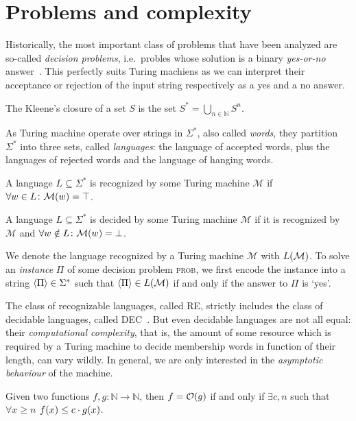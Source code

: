 \section{Problems and complexity}
Historically, the most important class of problems that have been analyzed are so-called
\emph{decision problems}, i.e.\ probles whose solution is a binary \emph{yes-or-no} 
answer~\cite{Sipser2013}.
This perfectly suits Turing machiens as we can interpret their acceptance or rejection of the input 
string respectively as a yes and a no answer.

\begin{definition}
  The Kleene's closure of a set \(S\) is the set \(S^* = \bigcup_{n \in \mathbb{N}}{S^n}\).
\end{definition}

As Turing machine operate over strings in \(\Sigma^*\), also called \emph{words}, they partition 
\(\Sigma^* \) into three sets, called \emph{languages}: the language of accepted words, 
plus the languages of rejected words and the language of hanging words.
\begin{definition}
  A language \(L \subseteq \Sigma^*\) is recognized by some Turing machine \(\mathcal{M}\) if 
  \(\forall w \in L\colon \call{\mathcal{M}}{w} = \top \).
\end{definition}
\begin{definition}
  A language \(L \subseteq \Sigma^*\) is decided by some Turing machine \(\mathcal{M}\) if it is 
  recognized by \(\mathcal{M}\) and \(\forall w \notin L\colon \call{\mathcal{M}}{w} = \bot \).
\end{definition}

We denote the language recognized by a Turing machine \(\mathcal{M}\) with \(\call{L}{\mathcal{M}}\).
To solve an \emph{instance} \(\Pi \) of some decision problem \textsc{prob}, we first encode the 
instance into a string \(\left\langle\Pi\right\rangle \in \Sigma^*\) such that 
\(\Encode{\Pi} \in \call{L}{\mathcal{M}}\) if and only if the answer to \(\Pi \) is `yes'.

The class of recognizable languages, called \textsc{RE}, strictly includes the class of decidable 
languages, called \textsc{DEC}~\cite{Turing1937}.
But even decidable languages are not all equal: their \emph{computational complexity}, that is,
the amount of some resource which is required by a Turing machine to decide membership words in 
function of their length, can vary wildly.
In general, we are only interested in the \emph{asymptotic behaviour} of the machine.
\begin{definition}
  Given two functions \(f, g\colon \mathbb{N} \to \mathbb{N}\), then \(f = \BigO{g}\) if 
  and only if \(\exists c,n\) such that \(\forall x \ge n\) \(\call{f}{x} \le c \cdot \call{g}{x}\).
\end{definition}

